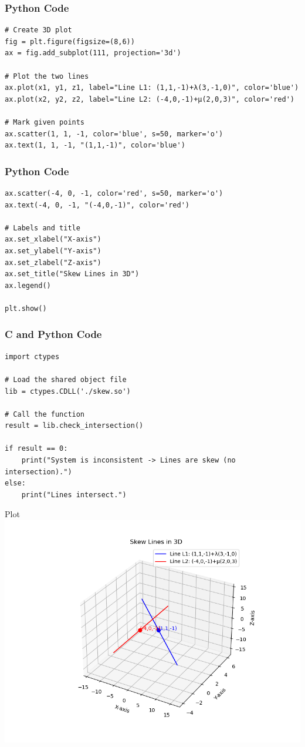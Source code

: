 \documentclass{beamer}
\begin{document}
\begin{frame}[fragile]
\frametitle{Python Code}
\begin{lstlisting}
# Create 3D plot
fig = plt.figure(figsize=(8,6))
ax = fig.add_subplot(111, projection='3d')

# Plot the two lines
ax.plot(x1, y1, z1, label="Line L1: (1,1,-1)+λ(3,-1,0)", color='blue')
ax.plot(x2, y2, z2, label="Line L2: (-4,0,-1)+μ(2,0,3)", color='red')

# Mark given points
ax.scatter(1, 1, -1, color='blue', s=50, marker='o')
ax.text(1, 1, -1, "(1,1,-1)", color='blue')
\end{lstlisting}
\end{frame}
\begin{frame}[fragile]
    \frametitle{Python Code}
    \begin{lstlisting}
ax.scatter(-4, 0, -1, color='red', s=50, marker='o')
ax.text(-4, 0, -1, "(-4,0,-1)", color='red')

# Labels and title
ax.set_xlabel("X-axis")
ax.set_ylabel("Y-axis")
ax.set_zlabel("Z-axis")
ax.set_title("Skew Lines in 3D")
ax.legend()

plt.show()

\end{lstlisting}
\end{frame}
\begin{frame}[fragile]
\frametitle{C and Python Code}
\begin{lstlisting}
import ctypes

# Load the shared object file
lib = ctypes.CDLL('./skew.so')

# Call the function
result = lib.check_intersection()

if result == 0:
    print("System is inconsistent -> Lines are skew (no intersection).")
else:
    print("Lines intersect.")

\end{lstlisting}
\end{frame}

\begin{frame}{Plot}
    \centering
    \includegraphics[width=\columnwidth, height=0.8\textheight, keepaspectratio]{Figure_8.png}     
\end{frame}
\end{document}
